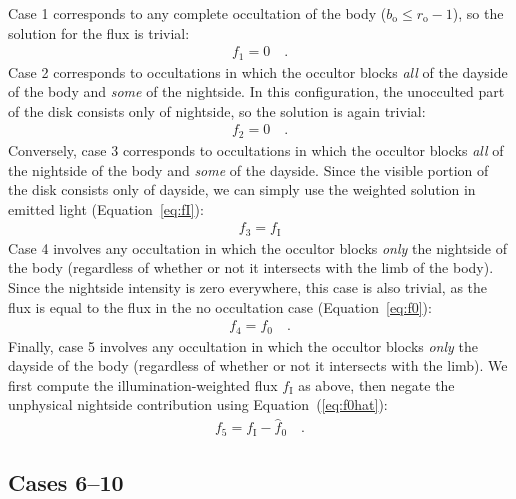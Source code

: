 \documentclass[modern]{aastex62}
\begin{document}
Case 1 corresponds to any complete occultation of the body
($b_\mathrm{o} \le r_\mathrm{o} - 1$), so the solution for the flux is trivial:
%
\begin{align}
    \label{eq:f1}
    f_1 = 0
    \quad.
\end{align}
%
Case 2 corresponds to occultations in which the occultor blocks \emph{all} of
the dayside of the body and \emph{some} of the nightside. In this
configuration, the unocculted part of the disk consists only of nightside, so
the solution is again trivial:
%
\begin{align}{}
    \label{eq:f2}
    f_2 = 0
    \quad.
\end{align}
%
Conversely, case 3 corresponds to occultations in which the occultor blocks
\emph{all} of the nightside of the body and \emph{some} of the dayside.
Since the visible portion of the disk consists only of dayside, we can
simply use the weighted solution in emitted light
(Equation~\ref{eq:fI}):
%
\begin{align}
    \label{eq:f3}
    f_3 = f_\mathrm{I}
\end{align}
%
Case 4 involves any occultation in which the occultor blocks \emph{only} the
nightside of the body (regardless of whether or not it intersects with the
limb of the body). Since the nightside intensity is zero everywhere, this case
is also trivial, as the flux is equal to the flux in the no occultation case
(Equation~\ref{eq:f0}):
%
\begin{align}
    \label{eq:f4}
    f_4 = f_0
    \quad.
\end{align}
%
Finally, case 5 involves any occultation in which the occultor blocks
\emph{only} the dayside of the body (regardless of whether or not it
intersects with the limb). We first compute the illumination-weighted flux
$f_\mathrm{I}$ as above, then negate the unphysical nightside contribution
using Equation~(\ref{eq:f0hat}):
%
\begin{align}
    \label{eq:f5}
    f_5 = f_\mathrm{I} - \hat{f}_0
    \quad.
\end{align}

%

\subsection{Cases 6--10}
\label{sec:cases-hard}
%
\end{document}
